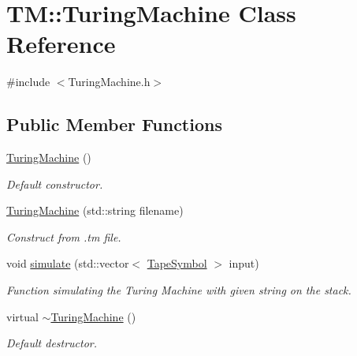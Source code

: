 \hypertarget{classTM_1_1TuringMachine}{\section{\-T\-M\-:\-:\-Turing\-Machine \-Class \-Reference}
\label{dd/d15/classTM_1_1TuringMachine}
}


{\ttfamily \#include $<$\-Turing\-Machine.\-h$>$}

\subsection*{\-Public \-Member \-Functions}
\begin{DoxyCompactItemize}
\item 
\hyperlink{classTM_1_1TuringMachine_afe0ee742405dc0279765af22666df9d3}{\-Turing\-Machine} ()
\begin{DoxyCompactList}\small\item\em \-Default constructor. \end{DoxyCompactList}\item 
\hyperlink{classTM_1_1TuringMachine_a92026a3ba4e06bfed9abf0ac2b56709a}{\-Turing\-Machine} (std\-::string filename)
\begin{DoxyCompactList}\small\item\em \-Construct from .tm file. \end{DoxyCompactList}\item 
void \hyperlink{classTM_1_1TuringMachine_a72857c5669511dcfca719ddd6422e8f8}{simulate} (std\-::vector$<$ \hyperlink{namespaceTM_af53c0529f78dfcdeb19c450abbd44cf6}{\-Tape\-Symbol} $>$ input)
\begin{DoxyCompactList}\small\item\em \-Function simulating the \-Turing \-Machine with given string on the stack. \end{DoxyCompactList}\item 
virtual \hyperlink{classTM_1_1TuringMachine_aa0d38ebf67a34efdc5e404086f936285}{$\sim$\-Turing\-Machine} ()
\begin{DoxyCompactList}\small\item\em \-Default destructor. \end{DoxyCompactList}\end{DoxyCompactItemize}
